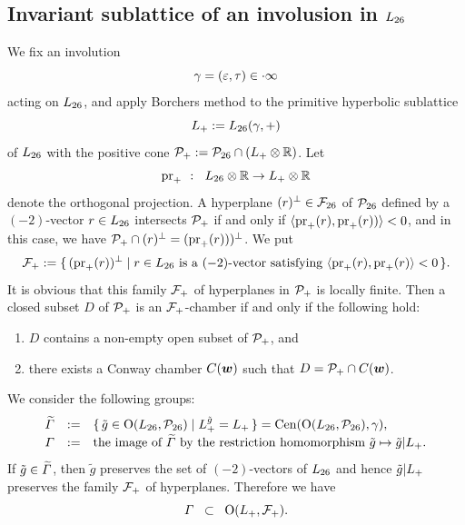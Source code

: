 \documentclass{amsart} %
\begin{document}
\subsection{Invariant  sublattice of an involusion in $L_{26}$}\label{subsec:sublatLts}
%
We fix an involution
%
\begin{equation*}\label{eq:gamma}
\gamma=(\varepsilon, \tau)\in \cdot \infty
\end{equation*}
%
 acting on $L_{26}$, and 
 apply Borchers method to  the primitive hyperbolic sublattice
\[
L_{+}:=L_{26}(\gamma, +)
\]
of $L_{26}$ 
with the positive cone $\mathord{\mathcal{P}}_{+}:=\mathord{\mathcal{P}}_{26}\cap(L_{+}\otimes \mathord{\mathbb{R}})$.
Let
\[
\operatorname{pr}_{+}\;\;\colon\;\; L_{26}\otimes \mathord{\mathbb{R}} \to L_{+}\otimes \mathord{\mathbb{R}}
\]
denote the orthogonal projection.
A hyperplane $(r)^{\perp}\in {\mathord{\mathcal{F}}}_{26}$ of $\mathord{\mathcal{P}}_{26}$
defined by a $(-2)$-vector $r\in L_{26}$
intersects $\mathord{\mathcal{P}}_{+}$
if and only if
$\langle \operatorname{pr}_{+}(r), \operatorname{pr}_{+}(r)) \rangle<0$,
and in this case,
we have $ \mathord{\mathcal{P}}_{+}\cap (r)^{\perp}=(\operatorname{pr}_{+}(r)))^{\perp}$.
We put
\[
\mathord{\mathcal{F}}_{+}:=\{\,{(\operatorname{pr}_{+}(r))^{\perp}}\mid {\textrm{$r\in L_{26}$ is a $(-2)$-vector satisfying  
$\langle \operatorname{pr}_{+}(r), \operatorname{pr}_{+}(r) \rangle<0$}} \,\}.
\]
It is obvious that this family $\mathord{\mathcal{F}}_{+}$ of hyperplanes in $\mathord{\mathcal{P}}_{+}$ is locally finite.
Then a closed subset $D$ of $\mathord{\mathcal{P}}_{+}$ is 
an $\mathord{\mathcal{F}}_{+}$-chamber if and only if  the following hold:
%
\begin{enumerate}[label=(\alph*)]
\item 
$D$ contains a non-empty open subset of $\mathord{\mathcal{P}}_{+}$, and 
\item there exists a Conway chamber $\mathord{C}(\boldsymbol{w})$
such that $D=\mathord{\mathcal{P}}_{+}\cap \mathord{C}(\boldsymbol{w})$.
\end{enumerate}
%
We consider the following groups: 
%
\begin{equation}\label{eq:vGamdef}
\renewcommand{\arraystretch}{1.2}
\begin{array}{ccl}
\tilvGam &:=& \set{\tilde{g}\in \OG(\Lts, \PPPts)}{\Lplus^{\tilde{g}}=\Lplus}=\Cen(\OG(\Lts, \PPPts), \gamma),  \\
\vGam &:=& \textrm{the image of $\tilvGam$ by the restriction homomorphism 
$\tilde{g}\mapsto \tilde{g}|\Lplus$}.
\end{array}
\end{equation}
%
%
If $\tilde{g}\in \widetilde{\varGamma}$,
then $\tilde{g}$ preserves the set of $(-2)$-vectors of $L_{26}$ and hence $\tilde{g}|L_{+}$
preserves the family $\mathord{\mathcal{F}}_{+}$ of hyperplanes.
Therefore we have
\[
\varGamma\;\;\subset \;\; \mathord{\mathrm{O}}(L_{+}, \mathord{\mathcal{F}}_{+}).
\]
\end{document}
